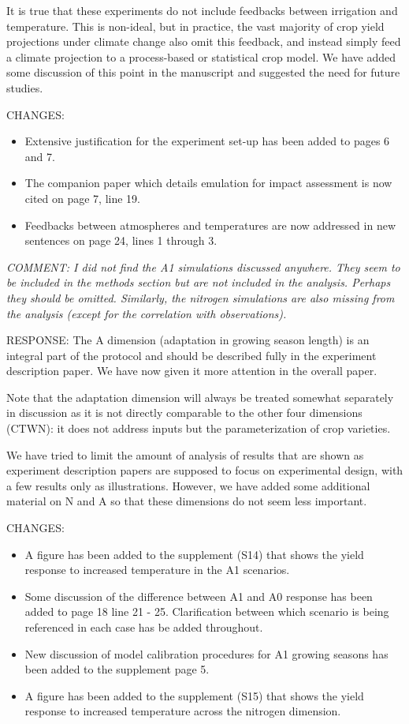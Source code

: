 \documentclass[gmd, manuscript]{copernicus} %
\begin{document}
It is true that these experiments do not include feedbacks between irrigation and temperature. This is non-ideal, but in practice, the vast majority of crop yield projections under climate change also omit this feedback, and instead simply feed a climate projection to a process-based or statistical crop model.  We have added some discussion of this point in the manuscript and suggested the need for future studies.
\smallskip

CHANGES: 
\begin{itemize}
    \item Extensive justification for the experiment set-up has been added to pages 6 and 7. 
    \item The companion paper which details emulation for impact assessment is now cited on page 7, line 19.
    \item Feedbacks between atmospheres and temperatures are now addressed in new sentences on page 24, lines 1 through 3.
\end{itemize}
\smallskip

\textcolor{dark-gray}{\textit{COMMENT: I did not find the A1 simulations discussed anywhere. They seem to be included in the methods section but are not included in the analysis. Perhaps they should be omitted. Similarly, the nitrogen simulations are also missing from the analysis (except for the correlation with observations).}}

RESPONSE: The A dimension (adaptation in growing season length) is an integral part of the protocol and should be described fully in the experiment description paper. We have now given it more attention in the overall paper.

Note that the adaptation dimension will always be treated somewhat separately in discussion as it is not directly comparable to the other four dimensions (CTWN):  it does not address inputs but the parameterization of crop varieties.

We have tried to limit the amount of analysis of results that are shown as experiment description papers are supposed to focus on experimental design, with a few results only as illustrations. However, we have added some additional material on N and A so that these dimensions do not seem less important.
\smallskip

CHANGES:
\begin{itemize}
    \item A figure has been added to the supplement (S14) that shows the yield response to increased temperature in the A1 scenarios. 
    \item Some discussion of the difference between A1 and A0 response has been added to page 18 line 21 - 25. Clarification between which scenario is being referenced in each case has be added throughout.
    \item New discussion of model calibration procedures for A1 growing seasons has been added to the supplement page 5.
    \item A figure has been added to the supplement (S15) that shows the yield response to increased temperature across the nitrogen dimension.
\end{itemize}
\end{document}
